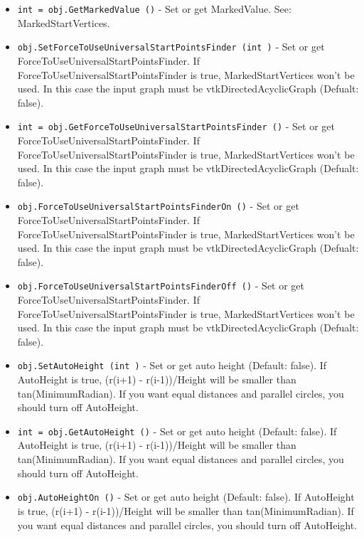 \begin{itemize}
\item  \verb|int = obj.GetMarkedValue ()| -  Set or get MarkedValue. See: MarkedStartVertices.

\item  \verb|obj.SetForceToUseUniversalStartPointsFinder (int )| -  Set or get ForceToUseUniversalStartPointsFinder. If ForceToUseUniversalStartPointsFinder is true, MarkedStartVertices won't be used.
 In this case the input graph must be vtkDirectedAcyclicGraph (Defualt: false).

\item  \verb|int = obj.GetForceToUseUniversalStartPointsFinder ()| -  Set or get ForceToUseUniversalStartPointsFinder. If ForceToUseUniversalStartPointsFinder is true, MarkedStartVertices won't be used.
 In this case the input graph must be vtkDirectedAcyclicGraph (Defualt: false).

\item  \verb|obj.ForceToUseUniversalStartPointsFinderOn ()| -  Set or get ForceToUseUniversalStartPointsFinder. If ForceToUseUniversalStartPointsFinder is true, MarkedStartVertices won't be used.
 In this case the input graph must be vtkDirectedAcyclicGraph (Defualt: false).

\item  \verb|obj.ForceToUseUniversalStartPointsFinderOff ()| -  Set or get ForceToUseUniversalStartPointsFinder. If ForceToUseUniversalStartPointsFinder is true, MarkedStartVertices won't be used.
 In this case the input graph must be vtkDirectedAcyclicGraph (Defualt: false).

\item  \verb|obj.SetAutoHeight (int )| -  Set or get auto height (Default: false). If AutoHeight is true, (r(i+1) - r(i-1))/Height will be smaller than tan(MinimumRadian).
 If you want equal distances and parallel circles, you should turn off AutoHeight.

\item  \verb|int = obj.GetAutoHeight ()| -  Set or get auto height (Default: false). If AutoHeight is true, (r(i+1) - r(i-1))/Height will be smaller than tan(MinimumRadian).
 If you want equal distances and parallel circles, you should turn off AutoHeight.

\item  \verb|obj.AutoHeightOn ()| -  Set or get auto height (Default: false). If AutoHeight is true, (r(i+1) - r(i-1))/Height will be smaller than tan(MinimumRadian).
 If you want equal distances and parallel circles, you should turn off AutoHeight.


\end{itemize}
